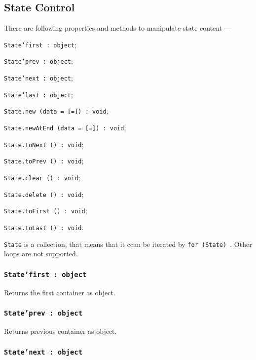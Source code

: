 \subsection{State Control}

There are following properties and methods to manipulate state content —
\begin{icItems}
	\item \texttt{State'first : object};
	\item \texttt{State'prev : object};
	\item \texttt{State'next : object};
	\item \texttt{State'last : object};
	\item \texttt{State.new (data = [=]) : void};
	\item \texttt{State.newAtEnd (data = [=]) : void};
	\item \texttt{State.toNext () : void};
	\item \texttt{State.toPrev () : void};
	\item \texttt{State.clear () : void};
	\item \texttt{State.delete () : void};
	\item \texttt{State.toFirst () : void};
	\item \texttt{State.toLast () : void}.
\end{icItems}

\texttt{State} is a collection, that means that it ccan be iterated by \texttt{for (State) {}}. Other loops are not supported.

\subsubsection{\texttt{State'first : object}}

Returns the first container as object.

\subsubsection{\texttt{State'prev : object}}

Returns previous container as object.

\subsubsection{\texttt{State'next : object}}

